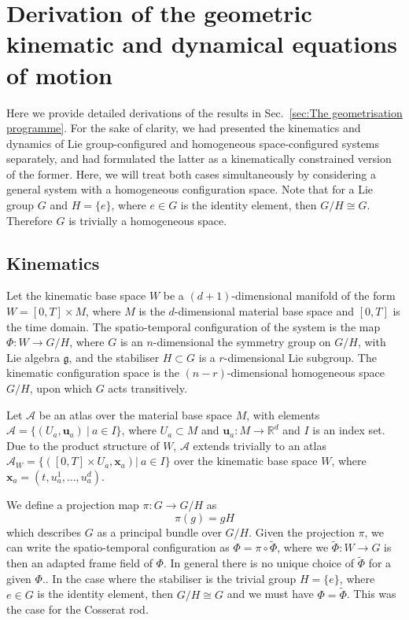 \section{Derivation of the geometric kinematic and dynamical equations of motion}

Here we provide detailed derivations of the results in Sec.~\ref{sec:The geometrisation programme}. For the sake of clarity, we had presented the kinematics and dynamics of Lie group-configured and homogeneous space-configured systems separately, and had formulated the latter as a kinematically constrained version of the former. Here, we will treat both cases simultaneously by considering a general system with a homogeneous configuration space. Note that for a Lie group $G$ and $H = \{e\}$, where $e \in G$ is the identity element, then $G/H \cong G$. Therefore $G$ is trivially a homogeneous space.

\subsection{Kinematics} \label{sec:Geometric kinematics}

Let the kinematic base space $W$ be a $(d+1)$-dimensional manifold of the form $W = [0, T] \times M$, where $M$ is the $d$-dimensional material base space and $[0, T]$ is the time domain. The spatio-temporal configuration of the system is the map $\Phi : W \to G/H$, where $G$ is an $n$-dimensional the symmetry group on $G/H$, with Lie algebra $\mathfrak{g}$, and the stabiliser $H \subset G$ is a $r$-dimensional Lie subgroup. The kinematic configuration space is the $(n-r)$-dimensional homogeneous space $G/H$, upon which $G$ acts transitively.

Let $\mathcal{A}$ be an atlas over the material base space $M$, with elements  $\mathcal{A} = \{ (U_a, \mathbf{u}_a)\ |\ a \in I \}$, where $U_a \subset M$ and $\mathbf{u}_a : M \to \mathbb{R}^d$ and $I$ is an index set. Due to the product structure of $W$, $\mathcal{A}$ extends trivially to an atlas $\mathcal{A}_W = \{ ([0, T] \times U_a , \mathbf{x}_a) |\ a \in I \}$ over the kinematic base space $W$, where $\mathbf{x}_a = (t, u_a^1, \dots, u^d_a)$.

We define a projection map $\pi : G \to G/H$ as
\begin{equation}
\pi(g) = gH
\end{equation}
which describes $G$ as a principal bundle over $G/H$. Given the projection $\pi$, we can write the spatio-temporal configuration as $\Phi = \pi \circ \tilde{\Phi}$, where we $\tilde{\Phi} : W \to G$ is then an adapted frame field of $\Phi$. In general there is no unique choice of $\tilde{\Phi}$ for a given $\Phi$.. In the case where the stabiliser is the trivial group $H = \{ e \}$, where $e \in G$ is the identity element, then $G/H \cong G$ and we must have $\Phi = \tilde{\Phi}$. This was the case for the Cosserat rod.


